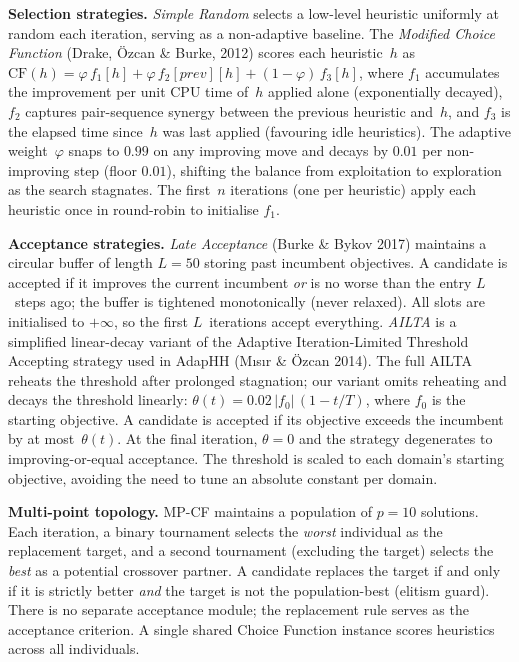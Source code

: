 \documentclass[11pt,a4paper]{article}
\begin{document}
\textbf{Selection strategies.}
\emph{Simple Random} selects a low-level heuristic uniformly at random each
iteration, serving as a non-adaptive baseline.
The \emph{Modified Choice Function} (Drake, \"{O}zcan \& Burke, 2012) scores each
heuristic~$h$ as
$\mathrm{CF}(h) = \varphi\,f_1[h] + \varphi\,f_2[\textit{prev}][h]
               + (1{-}\varphi)\,f_3[h]$,
where $f_1$ accumulates the improvement per unit CPU time of~$h$ applied alone
(exponentially decayed), $f_2$ captures pair-sequence synergy between the
previous heuristic and~$h$, and $f_3$ is the elapsed time since~$h$ was last
applied (favouring idle heuristics). The adaptive weight~$\varphi$ snaps to
$0.99$ on any improving move and decays by $0.01$ per non-improving step
(floor $0.01$), shifting the balance from exploitation to exploration as
the search stagnates. The first~$n$ iterations (one per heuristic) apply each
heuristic once in round-robin to initialise $f_1$.

\textbf{Acceptance strategies.}
\emph{Late Acceptance} (Burke \& Bykov 2017) maintains a circular buffer of
length $L{=}50$ storing past incumbent objectives. A candidate is accepted if
it improves the current incumbent \emph{or} is no worse than the entry
$L$~steps ago; the buffer is tightened monotonically (never relaxed). All
slots are initialised to $+\infty$, so the first $L$~iterations accept
everything.
\emph{AILTA} is a simplified linear-decay variant of the Adaptive
Iteration-Limited Threshold Accepting strategy used in AdapHH
(M{\i}s{\i}r \& \"{O}zcan 2014). The full AILTA reheats the threshold after
prolonged stagnation; our variant omits reheating and decays the threshold
linearly: $\theta(t) = 0.02\,|f_0|\,(1 - t/T)$, where $f_0$ is the starting
objective. A candidate is accepted if its objective exceeds the incumbent by
at most~$\theta(t)$. At the final iteration, $\theta = 0$ and the strategy
degenerates to improving-or-equal acceptance. The threshold is scaled to each
domain's starting objective, avoiding the need to tune an absolute constant
per domain.

\textbf{Multi-point topology.}
MP-CF maintains a population of $p{=}10$ solutions. Each iteration, a binary
tournament selects the \emph{worst} individual as the replacement target, and
a second tournament (excluding the target) selects the \emph{best} as a
potential crossover partner. A candidate replaces the target if and only if it
is strictly better \emph{and} the target is not the population-best (elitism
guard). There is no separate acceptance module; the replacement rule serves
as the acceptance criterion. A single shared Choice Function instance scores
heuristics across all individuals.
\end{document}
